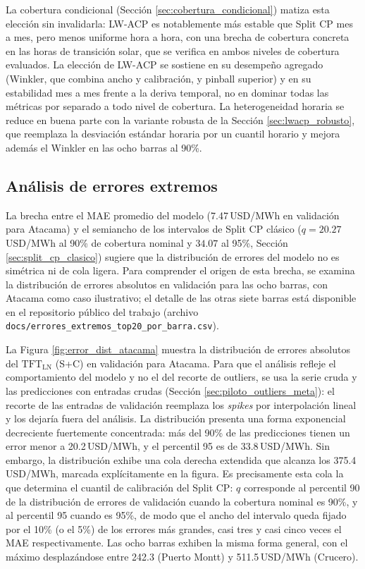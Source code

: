 La cobertura condicional (Sección \ref{sec:cobertura_condicional}) matiza esta elección sin invalidarla: LW-ACP es notablemente más estable que Split CP mes a mes, pero menos uniforme hora a hora, con una brecha de cobertura concreta en las horas de transición solar, que se verifica en ambos niveles de cobertura evaluados. La elección de LW-ACP se sostiene en su desempeño agregado (Winkler, que combina ancho y calibración, y pinball superior) y en su estabilidad mes a mes frente a la deriva temporal, no en dominar todas las métricas por separado a todo nivel de cobertura. La heterogeneidad horaria se reduce en buena parte con la variante robusta de la Sección \ref{sec:lwacp_robusto}, que reemplaza la desviación estándar horaria por un cuantil horario y mejora además el Winkler en las ocho barras al 90\%.

\subsection{Análisis de errores extremos}
\label{sec:errores_extremos}

La brecha entre el MAE promedio del modelo (7.47\,USD/MWh en validación para Atacama) y el semiancho de los intervalos de Split CP clásico ($q = 20.27$\,USD/MWh al 90\% de cobertura nominal y $34.07$ al 95\%, Sección \ref{sec:split_cp_clasico}) sugiere que la distribución de errores del modelo no es simétrica ni de cola ligera. Para comprender el origen de esta brecha, se examina la distribución de errores absolutos en validación para las ocho barras, con Atacama como caso ilustrativo; el detalle de las otras siete barras está disponible en el repositorio público del trabajo (archivo \texttt{docs/errores\_extremos\_top20\_por\_barra.csv}).

La Figura \ref{fig:error_dist_atacama} muestra la distribución de
errores absolutos del $\text{TFT}_\text{LN}$ (S+C) en validación para Atacama. Para que el análisis refleje el comportamiento del modelo y no el del recorte de outliers, se usa la serie cruda y las predicciones con entradas crudas (Sección \ref{sec:piloto_outliers_meta}): el recorte de las entradas de validación reemplaza los \textit{spikes} por interpolación lineal y los dejaría fuera del análisis. La distribución presenta una forma exponencial decreciente fuertemente concentrada: más del 90\% de las predicciones tienen un error menor a 20.2\,USD/MWh, y el percentil 95 es de 33.8\,USD/MWh. Sin embargo, la distribución exhibe una cola derecha extendida que alcanza los 375.4\,USD/MWh, marcada explícitamente en la figura. Es precisamente esta cola la que determina el cuantil de calibración del Split CP: $q$ corresponde al percentil 90 de la distribución de errores de validación cuando la cobertura nominal es 90\%, y al percentil 95 cuando es 95\%, de modo que el ancho del intervalo queda fijado por el 10\% (o el 5\%) de los errores más grandes, casi tres y casi cinco veces el MAE respectivamente. Las ocho barras exhiben la misma forma general, con el máximo desplazándose entre 242.3 (Puerto Montt) y 511.5\,USD/MWh (Crucero).

